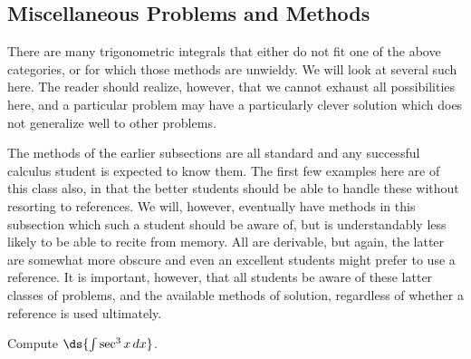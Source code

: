 \subsection{Miscellaneous Problems and Methods}
There are many trigonometric integrals that
either do not fit one of the above categories, or
for which those methods are unwieldy.  We
will look at several such here.  The reader should 
realize, however, that we cannot exhaust all
possibilities here, and a particular problem may have
a particularly clever solution which does not generalize
well to other problems.

The methods of the earlier subsections are all standard and any
successful calculus student is expected to know them.
The first few examples here are of this class also, in
that the better students should be able to handle these
without resorting to references.  We will, however, 
eventually have methods in this subsection
which such a student should be
aware of, but is understandably less likely to be able to 
recite from memory.
All are derivable, but again, the latter are somewhat more 
obscure and even an excellent students might prefer to use 
a reference.  It is important, however,  that all students
be aware of these latter classes of problems, 
and the available methods of solution,
regardless of whether a reference is used ultimately.

\bex Compute $\ds{\int\sec^3x\,dx}$.

